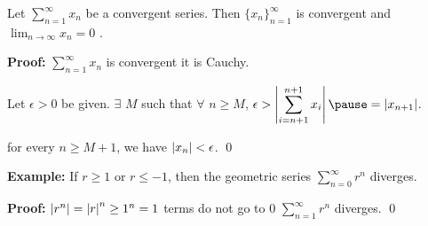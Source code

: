 \documentclass[10pt,aspectratio=169]{beamer}
\begin{document}
\begin{frame}

\begin{proposition}
Let $\displaystyle\sum_{n=1}^\infty x_n$ be a convergent series.  Then
$\{ x_n \}_{n=1}^\infty$ is convergent and
\quad
$\displaystyle
\lim_{n\to\infty} x_n = 0
$
.
\end{proposition}

\pause
\textbf{Proof:}
$\displaystyle\sum_{n=1}^\infty x_n$ is convergent \wthus it is Cauchy.

\pause
\medskip

Let $\epsilon > 0$ be given.
%
\pause
\qquad
%
$\exists$ $M$ such that $\forall$ $n \geq M$, \quad
$\displaystyle
\epsilon > 
\abs{ \sum_{i={n+1}}^{n+1} x_i }
\pause
=
\abs{ x_{n+1} }$.

\pause
\medskip

\thus \quad for every $n \geq M+1$, we have $\left\lvert {x_{n}} \right\rvert < \epsilon$.
\qed

\pause
\medskip

\textbf{Example:}
If $r \geq 1$ or $r \leq -1$, then the geometric series $\displaystyle \sum_{n=0}^\infty r^n$
diverges.

\pause
\medskip

\textbf{Proof:}
$\left\lvert {r^n} \right\rvert = \left\lvert {r} \right\rvert^n \geq 1^n = 1$ 
\pause
\wthus terms do not go to 0
\pause
\wthus
$\displaystyle\sum_{n=1}^\infty r^n$ diverges.
\qed

\end{frame}
\end{document}
